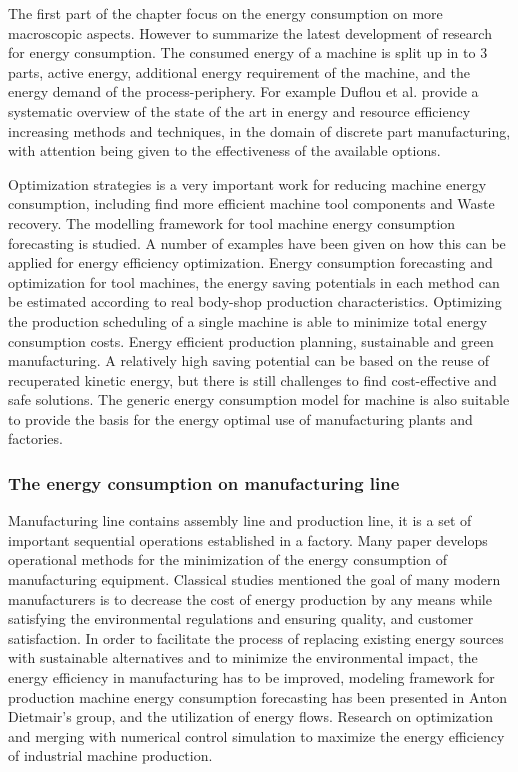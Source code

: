The first part of the chapter focus on the energy consumption on more macroscopic aspects. However to summarize the latest development of research for energy consumption. The consumed energy of a machine is split up in to 3 parts, active energy, additional energy requirement of the machine, and the energy demand of the process-periphery.  For example Duflou et al.\cite{Duflou2012} provide a systematic overview of the state of the art in energy and resource efficiency increasing methods and techniques, in the domain of discrete part manufacturing, with attention being given to the effectiveness of the available options.

Optimization strategies is a very important work for reducing machine energy consumption, including find more efficient machine tool components and Waste recovery. The modelling framework for tool machine energy consumption forecasting is studied. A number of examples have been given on how this can be applied for energy efficiency optimization. Energy consumption forecasting and optimization for tool machines,   the energy saving potentials in each method can be estimated according to real body-shop production characteristics. Optimizing the production scheduling of a single machine is able to minimize total energy consumption costs. Energy efficient production planning, sustainable and green manufacturing. A relatively high saving potential can be based on the reuse of recuperated kinetic energy, but there is still challenges to find cost-effective and safe solutions. The generic energy consumption model for machine is also suitable to provide the basis for the energy optimal use of manufacturing plants and factories.




\subsubsection{The energy consumption on manufacturing line }

Manufacturing line contains assembly line and production line, it is a set of important sequential operations established in a factory. Many paper develops operational methods for the minimization of the energy consumption of manufacturing equipment. Classical studies \cite{Gungor1999} mentioned the goal of many modern manufacturers is to decrease the cost of energy production by any means while satisfying the environmental regulations and ensuring quality, and customer satisfaction. In order to facilitate the process of replacing existing energy sources with sustainable alternatives and to minimize the environmental impact, the energy efficiency in manufacturing has to be improved, modeling framework for production machine energy consumption forecasting has been presented in Anton Dietmair’s group, and the utilization of energy flows. Research on optimization and merging with numerical control simulation to maximize the energy efficiency of industrial machine production. 


